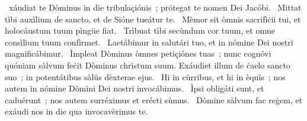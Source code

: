 \psalmChapterWithInscription{}
{ }
{%
~xáudiat te Dòminus in die tribulaçiónis~; prótegat te nomen Dei Jacóbi. 
~Mittat tìbi auxìlium de sancto, et de Sióne tueátur te. 
~Mèmor sit òmnis sacrifìċii tui, et holocáustum tuum pìngüe fiat. 
~Trìbuat tìbi secùndum cor tuum, et omne consìlium tuum confìrmet. 
~Laetábimur in salutári tuo, et in nómine Dei nostri magnificábimur. 
~Ìmpleat Dòminus òmnes petiçiónes tuas~; nunc cognóvi quóniam sàlvum feċit Dòminus christum suum. Exáudiet illum de ċaelo sancto suo~; in potentátibus sàlüs dèxterae ejus. 
~Hi in cùrribus, et hi in èquïs~; nos autem in nómine Dòmini Dei nostri invocábimus. 
~Ìpsi obligáti sunt, et caduérunt~; nos autem surréximus et erécti sùmus. 
~Dòmine sàlvum fac reġem, et exáudi nos in die qua invocavèrimus te. 
}
